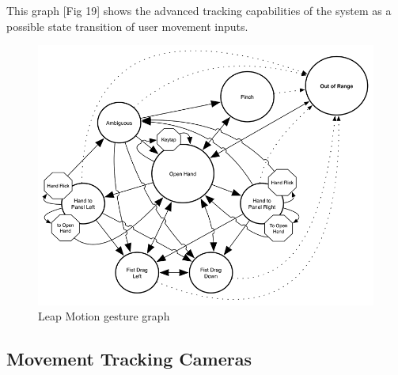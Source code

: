 \documentclass[a4paper,10pt]{article}
\begin{document}
This graph [Fig 19] shows the advanced tracking capabilities of the system as a possible state transition of user movement inputs.
\begin{figure}[H]
\centerline{\includegraphics[scale=0.4]{leapGraph.png}}
	\caption{Leap Motion gesture graph}
	\label{fig:handGraph}
	\end{figure}
\subsection{Movement Tracking Cameras}
\end{document}
